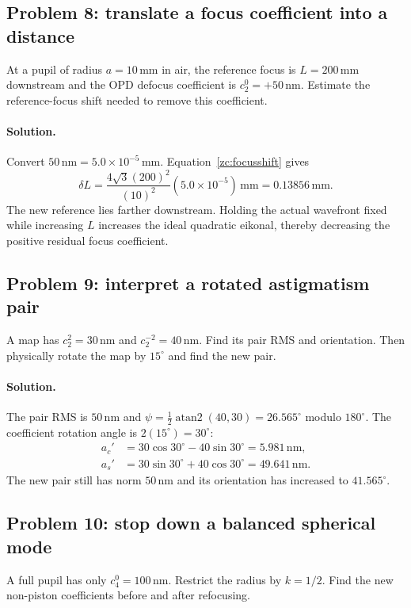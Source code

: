 \subsection*{Problem 8: translate a focus coefficient into a distance}
At a pupil of radius $a=10\,\mathrm{mm}$ in air, the reference focus
is $L=200\,\mathrm{mm}$ downstream and the OPD defocus coefficient
is $c_2^0=+50\,\mathrm{nm}$. Estimate the reference-focus shift
needed to remove this coefficient.

\paragraph{Solution.}
Convert $50\,\mathrm{nm}=5.0\times10^{-5}\,\mathrm{mm}$.
Equation~\eqref{zc:focusshift} gives
\begin{equation}
 \delta L=\frac{4\sqrt3(200)^2}{(10)^2}
                       (5.0\times10^{-5})\,\mathrm{mm}
           =0.13856\,\mathrm{mm}.
\end{equation}
The new reference lies farther downstream. Holding the actual
wavefront fixed while increasing $L$ increases the ideal quadratic
eikonal, thereby decreasing the positive residual focus coefficient.

\subsection*{Problem 9: interpret a rotated astigmatism pair}
A map has $c_2^2=30\,\mathrm{nm}$ and
$c_2^{-2}=40\,\mathrm{nm}$. Find its pair RMS and orientation.
Then physically rotate the map by $15^\circ$ and find the new pair.

\paragraph{Solution.}
The pair RMS is $50\,\mathrm{nm}$ and
$\psi=\tfrac12\operatorname{atan2}(40,30)=26.565^\circ$ modulo
$180^\circ$. The coefficient rotation angle is $2(15^\circ)=30^\circ$:
\begin{align}
 a_c'&=30\cos30^\circ-40\sin30^\circ=5.981\,\mathrm{nm},\\
 a_s'&=30\sin30^\circ+40\cos30^\circ=49.641\,\mathrm{nm}.
\end{align}
The new pair still has norm $50\,\mathrm{nm}$ and its orientation
has increased to $41.565^\circ$.

\subsection*{Problem 10: stop down a balanced spherical mode}
A full pupil has only $c_4^0=100\,\mathrm{nm}$. Restrict the radius
by $k=1/2$. Find the new non-piston coefficients before and after
refocusing.

